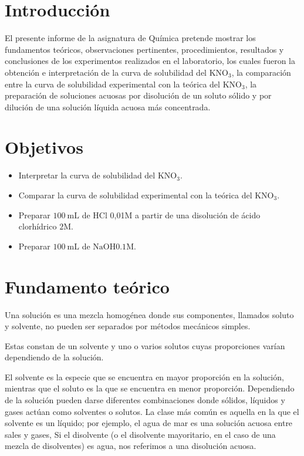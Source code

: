 \documentclass[11pt]{scrartcl}
\author{Laboratorio de Qu\'imica}
\begin{document}
\tableofcontents
\newpage

\section{Introducción}
El presente informe de la asignatura de Química pretende mostrar los fundamentos teóricos, observaciones pertinentes, procedimientos, resultados y conclusiones de los experimentos realizados en el laboratorio, los cuales fueron la obtención e interpretación de la curva de solubilidad del $\mathrm{KNO}_{3}$, la comparación entre la curva de solubilidad experimental con la teórica del $\mathrm{KNO}_{3}$, la preparación de soluciones acuosas por disolución de un soluto sólido y por dilución de una solución líquida acuosa más concentrada.


\section{Objetivos}
\begin{itemize}
  \item Interpretar la curva de solubilidad del $\mathrm{KNO}_{3}$.

  \item Comparar la curva de solubilidad experimental con la teórica del $\mathrm{KNO}_{3}$.

  \item Preparar $100 \mathrm{~mL}$ de $\mathrm{HCl}$ 0,01M a partir de una disolución de ácido clorhídrico $2 \mathrm{M}$.

  \item Preparar $100 \mathrm{~mL}$ de $\mathrm{NaOH} 0.1 \mathrm{M}$.

\end{itemize}

\section{Fundamento teórico}
Una solución es una mezcla homogénea donde sus componentes, llamados soluto y solvente, no pueden ser separados por métodos mecánicos simples.

Estas constan de un solvente y uno o varios solutos cuyas proporciones varían dependiendo de la solución.

El solvente es la especie que se encuentra en mayor proporción en la solución, mientras que el soluto es la que se encuentra en menor proporción. Dependiendo de la solución pueden darse diferentes combinaciones donde sólidos, líquidos y gases actúan como solventes o solutos. La clase más común es aquella en la que el solvente es un líquido; por ejemplo, el agua de mar es una solución acuosa entre sales y gases, Si el disolvente (o el disolvente mayoritario, en el caso de una mezcla de disolventes) es agua, nos referimos a una disolución acuosa.\cite{UNI}
\end{document}
